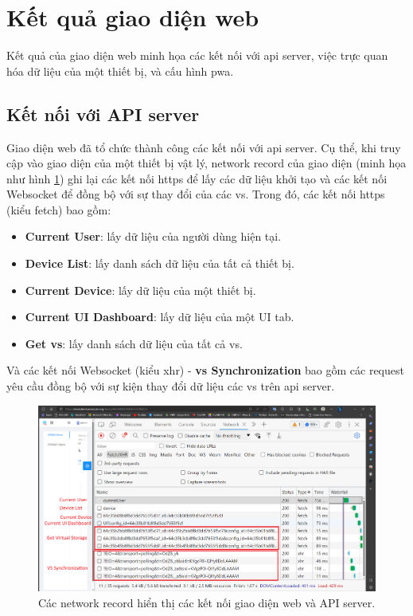\section{Kết quả giao diện web}

Kết quả của giao diện web minh họa các kết nối với \acrshort{api} server, việc trực quan hóa dữ liệu của một thiết bị, và cấu hình \acrfull{pwa}.

\subsection{Kết nối với API server}

Giao diện web đã tổ chức thành công các kết nối với \acrshort{api} server. Cụ thể, khi truy cập vào giao diện của một thiết bị vật lý, network record của giao diện (minh họa như hình \ref{fig:network-fetch}) ghi lại các kết nối \acrshort{https} để lấy các dữ liệu khởi tạo và các kết nối Websocket để đồng bộ với sự thay đổi của các \acrshort{vs}. Trong đó, các kết nối \acrshort{https} (kiểu fetch) bao gồm:
\begin{itemize}
    \item \textbf{Current User}: lấy dữ liệu của người dùng hiện tại.
    \item \textbf{Device List}: lấy danh sách dữ liệu của tất cả thiết bị.
    \item \textbf{Current Device}: lấy dữ liệu của một thiết bị.
    \item \textbf{Current UI Dashboard}: lấy dữ liệu của một UI tab.
    \item \textbf{Get \acrlong{vs}}: lấy danh sách dữ liệu của tất cả \acrshort{vs}.
\end{itemize}

Và các kết nối Websocket (kiểu xhr) - \textbf{\acrshort{vs} Synchronization} bao gồm các request yêu cầu đồng bộ với sự kiện thay đổi dữ liệu các \acrshort{vs} trên \acrshort{api} server.

\begin{figure}[htp]
\centering
\captionsetup{justification=centering,margin=2cm}
\includegraphics[width=1.0\linewidth, frame]{images/fig-network-fetch.png}
\caption{Các network record hiển thị các kết nối giao diện web và API server.}
\label{fig:network-fetch}
\end{figure}

